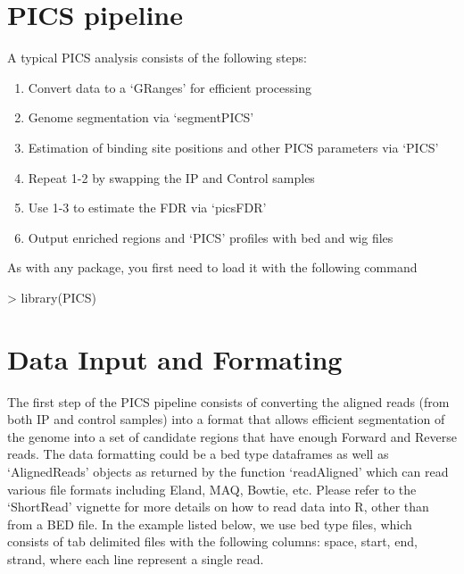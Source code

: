 \documentclass[a4paper]{article}
\begin{document}
\section{PICS pipeline}
A typical PICS analysis consists of the following steps:
\begin{enumerate}
  \item Convert data to a `GRanges' for efficient processing
  \item Genome segmentation via `segmentPICS'
  \item Estimation of binding site positions and other PICS parameters via `PICS'
  \item Repeat 1-2 by swapping the IP and Control samples
  \item Use 1-3 to estimate the FDR via `picsFDR'
  \item Output enriched regions and `PICS' profiles with bed and wig files
\end{enumerate}

As with any package, you first need to load it with the following command

\begin{Schunk}
\begin{Sinput}
> library(PICS)
\end{Sinput}
\end{Schunk}

\section{Data Input and Formating}
The first step of the PICS pipeline consists of converting the aligned reads (from both IP and control samples) into a format that allows efficient segmentation of the genome into a set of candidate regions that have enough Forward and Reverse reads. The data formatting could be a bed type dataframes as well as `AlignedReads' objects as returned by the function `readAligned' which can read various file formats including Eland, MAQ, Bowtie, etc. Please refer to the `ShortRead' vignette for more details on how to read data into R, other than from a BED file. In the example listed below, we use bed type files, which consists of tab delimited files with the following columns: space, start, end, strand, where each line represent a single read. 
\end{document}
